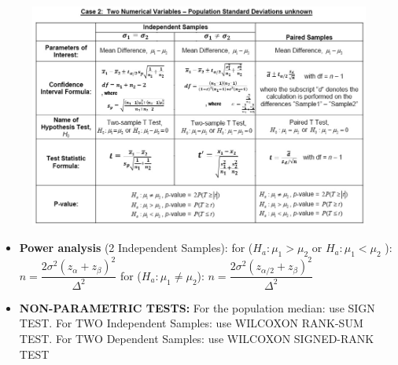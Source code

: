 \documentclass[twoside]{article}
\newcommand{\0}{\mathbf{0}}
\begin{document}
\vspace{-4.5cm}
\begin{figure}[h]
\hspace{2cm}\includegraphics[width=.7\textwidth,right]{HT_3.jpg}
\end{figure}
\vspace{-5.5cm}
\begin{itemize}
\item \textbf{Power analysis} (2 Independent Samples):
\subitem for ($H_a:\mu_1>\mu_2$ or $H_a:\mu_1<\mu_2$ ): 
\subsubitem $n=\dfrac{2\sigma^2(z_\alpha+z_\beta)^2}{\Delta^2}$
\subitem for ($H_a:\mu_1 \neq \mu_2$): 
\subsubitem $n=\dfrac{2\sigma^2(z_{\alpha/2}+z_\beta)^2}{\Delta^2}$
\vspace{.5cm}
\item \textbf{NON-PARAMETRIC TESTS:} For the population median: use SIGN TEST. For TWO Independent Samples: use WILCOXON RANK-SUM TEST. For TWO Dependent Samples: use WILCOXON SIGNED-RANK TEST
\end{itemize}
\end{document}
